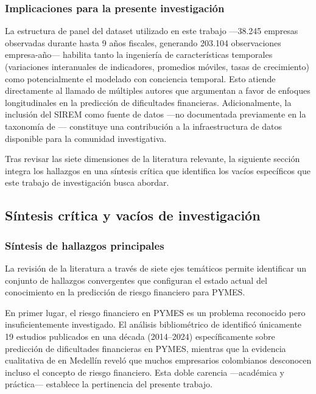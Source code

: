 \documentclass[12pt, letterpaper]{article}
\begin{document}
\subsubsection{Implicaciones para la presente investigaci\'on}

La estructura de panel del dataset utilizado en este trabajo ---38.245 empresas observadas durante hasta 9 a\~nos fiscales, generando 203.104 observaciones empresa-a\~no--- habilita tanto la ingenier\'ia de caracter\'isticas temporales (variaciones interanuales de indicadores, promedios m\'oviles, tasas de crecimiento) como potencialmente el modelado con conciencia temporal. Esto atiende directamente al llamado de m\'ultiples autores \citep{Zhou2022, Otsuki2022, Zhang2025} que argumentan a favor de enfoques longitudinales en la predicci\'on de dificultades financieras. Adicionalmente, la inclusi\'on del SIREM como fuente de datos ---no documentada previamente en la taxonom\'ia de \citet{Wang2024datasets}--- constituye una contribuci\'on a la infraestructura de datos disponible para la comunidad investigativa.

Tras revisar las siete dimensiones de la literatura relevante, la siguiente secci\'on integra los hallazgos en una s\'intesis cr\'itica que identifica los vac\'ios espec\'ificos que este trabajo de investigaci\'on busca abordar.

\subsection{S\'intesis cr\'itica y vac\'ios de investigaci\'on}
\label{sec:sintesis}

\subsubsection{S\'intesis de hallazgos principales}

La revisi\'on de la literatura a trav\'es de siete ejes tem\'aticos permite identificar un conjunto de hallazgos convergentes que configuran el estado actual del conocimiento en la predicci\'on de riesgo financiero para PYMES.

En primer lugar, el riesgo financiero en PYMES es un problema reconocido pero insuficientemente investigado. El an\'alisis bibliom\'etrico de \citet{Abubakar2025} identific\'o \'unicamente 19 estudios publicados en una d\'ecada (2014--2024) espec\'ificamente sobre predicci\'on de dificultades financieras en PYMES, mientras que la evidencia cualitativa de \citet{CardonaZuleta2025} en Medell\'in revel\'o que muchos empresarios colombianos desconocen incluso el concepto de riesgo financiero. Esta doble carencia ---acad\'emica y pr\'actica--- establece la pertinencia del presente trabajo.
\end{document}
